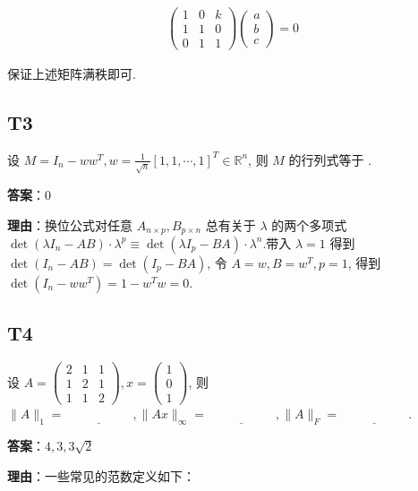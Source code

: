 \documentclass{article}
\begin{document}
\begin{align*}
	\begin{pmatrix}
		1 & 0 & k\\
		1 & 1 & 0\\
		0 & 1 & 1
	\end{pmatrix} \begin{pmatrix}
		a\\b\\c
	\end{pmatrix}=0
\end{align*}

保证上述矩阵满秩即可.

\subsection{T3}

\par 设 $M=I_n - ww^T, w=\frac{1}{\sqrt n}[ 1, 1, \cdots, 1]^T \in \mathbb R^n$, 则 $M$ 的行列式等于 \underline{\phantom{empty\_space}}.

\par \textbf{答案}：0

\par \textbf{理由}：换位公式对任意 $A_{n\times p}, B_{p\times n}$ 总有关于 $\lambda$ 的两个多项式 $\det(\lambda I_n - AB) \cdot \lambda^p \equiv \det(\lambda I_p - BA) \cdot \lambda^n $.带入 $\lambda = 1$ 得到 $\det(I_n - AB) = \det(I_p - BA)$,  令 $A=w, B=w^T, p=1$,  得到 $\det(I_n - ww^T)=1 - w^Tw=0$.

\subsection{T4}

\par 设 $A=\begin{pmatrix}
	2 & 1 & 1\\
	1 & 2 & 1\\
	1 & 1 & 2
\end{pmatrix}, x=\begin{pmatrix}
	1\\0\\1
\end{pmatrix}$, 则 $\|A\|_1=\underline{\phantom{empty\_space}}, \|Ax\|_{\infty}=\underline{\phantom{empty\_space}}, \|A\|_F=\underline{\phantom{empty\_space}}$.

\par \textbf{答案}：$4, 3, 3\sqrt 2$

\par \textbf{理由}：一些常见的范数定义如下：
\end{document}
